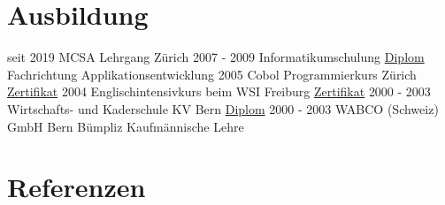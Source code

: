 \documentclass[a4paper]{twentysecondcv} %
\begin{document}
    \section{Ausbildung}
    \begin{twenty} %
        \twentyitem
        {seit 2019}
        {}
        {MCSA Lehrgang \textnormal{Zürich}}
        {}
        {}
        {}
        \twentyitem
        {2007 - 2009}
        {}
        {Informatikumschulung}
        {\hyperlink{informatik}{\textcolor{pblue}{Diplom}}}
        {Fachrichtung Applikationsentwicklung}
        {}
        \twentyitem
        {2005}
        {}
        {Cobol Programmierkurs \textnormal{Zürich}}
        {\hyperlink{cobol}{\textcolor{pblue}{Zertifikat}}}
        {}
        {}
        \twentyitem
        {2004}
        {}
        {Englischintensivkurs beim WSI \textnormal{Freiburg}}
        {\hyperlink{toeic}{\textcolor{pblue}{Zertifikat}}}
        {}
        {}
        \twentyitem
        {2000 - 2003}
        {}
        {Wirtschafts- und Kaderschule \textnormal{KV Bern}}
        {\hyperlink{kv}{\textcolor{pblue}{Diplom}}}
        {}
        {}
        \twentyitem
        {2000 - 2003}
        {}
        {WABCO (Schweiz) GmbH \textnormal{Bern Bümpliz}}
        {}
        {Kaufmännische Lehre}
        {}	%
    \end{twenty}

    \section{Referenzen}
\end{document}
